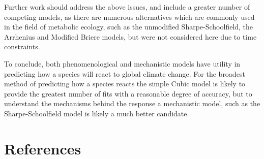 \documentclass[11pt]{article}
\begin{document}
Further work should address the above issues, and include a greater number of competing models, as there are numerous alternatives which are commonly used in the field of metabolic ecology, such as the unmodified Sharpe-Schoolfield, the Arrhenius and Modified Briere models, but were not considered here due to time constraints. 

To conclude, both phenomenological and mechanistic models have utility in predicting how a species will react to global climate change. For the broadest method of predicting how a species reacts the simple Cubic model is likely to provide the greatest number of fits with a reasonable degree of accuracy, but to understand the mechanisms behind the response a mechanistic model, such as the Sharpe-Schoolfield model is likely a much better candidate. 

\section{References}
{}

\end{document}
